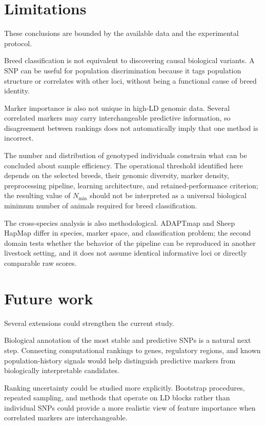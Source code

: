 \section*{Limitations}

These conclusions are bounded by the available data and the
experimental protocol.

Breed classification is not equivalent to discovering causal
biological variants. A SNP can be useful for population discrimination
because it tags population structure or correlates with other loci,
without being a functional cause of breed identity.

Marker importance is also not unique in high-LD genomic data.
Several correlated markers may carry interchangeable predictive
information, so disagreement between rankings does not
automatically imply that one method is incorrect.

The number and distribution of genotyped individuals constrain what
can be concluded about sample efficiency. The operational threshold
identified here depends on the selected breeds, their genomic
diversity, marker density, preprocessing pipeline, learning
architecture, and retained-performance criterion; the resulting value
of $N_{\min}$ should not be interpreted as a universal biological
minimum number of animals required for breed classification.

The cross-species analysis is also methodological. ADAPTmap and
Sheep HapMap differ in species, marker space, and classification
problem; the second domain tests whether the behavior of the pipeline
can be reproduced in another livestock setting, and it does not assume
identical informative loci or directly comparable raw scores.

\section*{Future work}

Several extensions could strengthen the current study.

Biological annotation of the most stable and predictive SNPs is a
natural next step. Connecting computational rankings to genes,
regulatory regions, and known population-history signals would help
distinguish predictive markers from biologically interpretable
candidates.

Ranking uncertainty could be studied more explicitly.
Bootstrap procedures, repeated sampling, and methods that operate on
LD blocks rather than individual SNPs could provide a more realistic
view of feature importance when correlated markers are
interchangeable.

